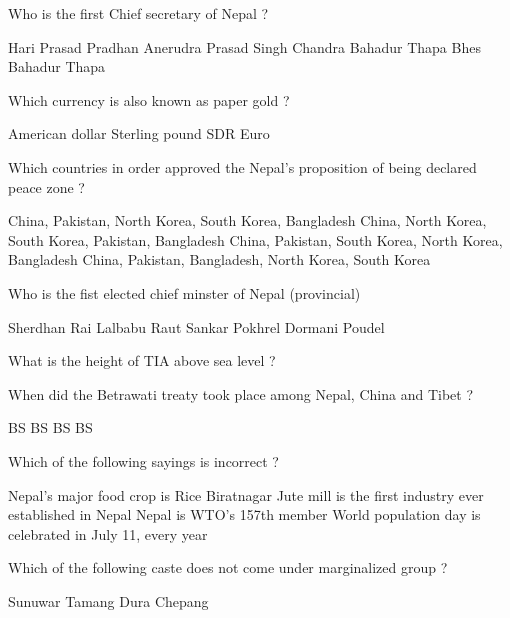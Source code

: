 \begin{questions}
\question Who is the first Chief secretary of Nepal ?
  \begin{choices}
  \choice Hari Prasad Pradhan
  \choice Anerudra Prasad Singh
  \CorrectChoice Chandra Bahadur Thapa
  \choice Bhes Bahadur Thapa
  \end{choices}

\question Which currency is also known as paper gold ?
  \begin{choices}
  \choice American dollar
  \choice Sterling pound
  \CorrectChoice SDR
  \choice Euro
  \end{choices}

\question Which countries in order approved the Nepal's proposition of being declared peace zone ?
  \begin{choices}
  \CorrectChoice China, Pakistan, North Korea, South Korea, Bangladesh
  \choice China, North Korea, South Korea, Pakistan, Bangladesh
  \choice China, Pakistan, South Korea, North Korea, Bangladesh
  \choice China, Pakistan, Bangladesh, North Korea, South Korea
  \end{choices}

\question Who is the fist elected chief minster of Nepal (provincial)
  \begin{choices}
  \choice Sherdhan Rai
  \choice Lalbabu Raut
  \choice Sankar Pokhrel
  \CorrectChoice Dormani Poudel
  \end{choices}

\question What is the height of TIA above sea level ?
  \begin{choices}
  \end{choices}

\question When did the Betrawati treaty took place among Nepal, China and Tibet ?
  \begin{choices}
   BS
   BS
   BS
   BS
  \end{choices}

\question Which of the following sayings is incorrect ?
  \begin{choices}
  \choice Nepal's major food crop is Rice
  \choice Biratnagar Jute mill is the first industry ever established in Nepal
  \CorrectChoice Nepal is WTO's 157th member
  \choice World population day is celebrated in July 11, every year
  \end{choices}

\question Which of the following caste does not come under marginalized group ?
  \begin{choices}
  \choice Sunuwar
  \choice Tamang
  \choice Dura
  \CorrectChoice Chepang
  \end{choices}


\end{questions}
